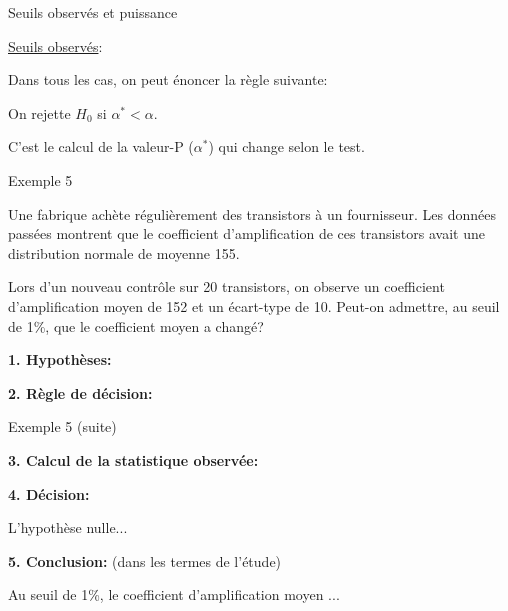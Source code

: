 \documentclass{BeamerTemplate}
\begin{document}

\begin{frame}[t]{Seuils observés et puissance}

\underline{Seuils observés}:

Dans tous les cas, on peut énoncer la règle suivante:

\centerline{\alert{On rejette $H_0$ si $\alpha^*<\alpha$.}}

C'est le calcul de la valeur-P ($\alpha^*$) qui change selon le test.

\bigskip
{}
\end{frame}

\begin{frame}[t]{Exemple 5}

Une fabrique achète régulièrement des transistors à un fournisseur. Les données passées montrent que le coefficient d'amplification de ces transistors avait une distribution normale de moyenne 155.

\medskip

Lors d'un nouveau contrôle sur 20 transistors, on observe un coefficient d'amplification moyen de 152 et un écart-type de 10. Peut-on admettre, au seuil de 1\%, que le coefficient  moyen a changé?


\bigskip

{\bf 1. Hypothèses:}
\bigskip

{\bf 2. Règle de décision:}

\end{frame}

\begin{frame}[t]{Exemple 5 (suite)}

{\bf 3. Calcul de la statistique observée:}

\vfill
{\bf 4. Décision:}

L'hypothèse nulle...

\bigskip
{\bf 5. Conclusion:} (dans les termes de l'étude)

Au seuil de 1\%, le coefficient d'amplification moyen ...
\bigskip

\end{frame}
\end{document}
